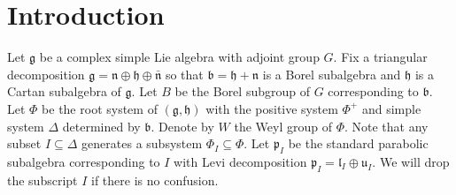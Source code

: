 \documentclass{amsart}[12pt]
\newcommand{\frg}{\mathfrak{g}}
\newcommand{\frh}{\mathfrak{h}}
\renewcommand{\subset}{\subseteq}
\numberwithin{equation}{section}
\begin{document}
\section{ Introduction}

Let $\mathfrak{g}$ be a complex simple Lie algebra with adjoint group $G$. Fix a triangular decomposition $\mathfrak{g}=\mathfrak{n}\oplus \mathfrak{h} \oplus \bar{\mathfrak{n}}$ so that $\mathfrak{b}=\mathfrak{h}+\mathfrak{n}$ is a Borel subalgebra and $\mathfrak{h}$ is a Cartan subalgebra of $\mathfrak{g}$. Let $B$ be the Borel subgroup of $G$ corresponding to $\mathfrak{b}$. Let $\Phi$ be the root system of $(\frg, \frh)$ with the positive system $\Phi^+$ and simple system $\Delta$ determined by $\mathfrak{b}$. Denote by $W$ the Weyl group of $\Phi$. Note that any subset $I\subset\Delta$ generates a subsystem $\Phi_I\subset\Phi$. Let $\mathfrak{p}_I$ be the standard parabolic subalgebra corresponding to $I$ with Levi decomposition $\mathfrak{p}_I=\mathfrak{l}_I\oplus \mathfrak{u}_I$.  We will drop the
subscript $I$ if there is no confusion.

\end{document}
